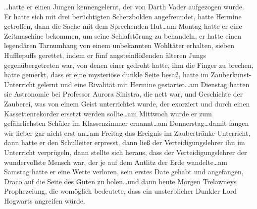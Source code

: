 …hatte er einen Jungen kennengelernt, der von Darth Vader aufgezogen wurde. Er hatte sich mit drei berüchtigten Scherzbolden angefreundet, hatte Hermine getroffen, dann die Sache mit dem Sprechenden Hut…am Montag hatte er eine Zeitmaschine bekommen, um seine Schlafstörung zu behandeln, er hatte einen legendären Tarnumhang von einem unbekannten Wohltäter erhalten, sieben Hufflepuffs gerettet, indem er fünf angsteinflößenden älteren Jungs gegenübergetreten war, von denen einer gedroht hatte, ihm die Finger zu brechen, hatte gemerkt, dass er eine mysteriöse dunkle Seite besaß, hatte im Zauberkunst-Unterricht  gelernt und eine Rivalität mit Hermine gestartet…am Dienstag hatten sie Astronomie bei Professor Aurora Sinistra, die nett war, und Geschichte der Zauberei, was von einem Geist unterrichtet wurde, der exorziert und durch einen Kassettenrekorder ersetzt werden sollte…am Mittwoch wurde er zum gefährlichsten Schüler im Klassenzimmer ernannt…am Donnerstag…damit fangen wir lieber gar nicht erst an…am Freitag das Ereignis im Zaubertränke-Unterricht, dann hatte er den Schulleiter erpresst, dann ließ der Verteidigungslehrer ihn im Unterricht verprügeln, dann stellte sich heraus, dass der Verteidigungslehrer der wundervollste Mensch war, der je auf dem Antlitz der Erde wandelte…am Samstag hatte er eine Wette verloren, sein erstes Date gehabt und angefangen, Draco auf die Seite des Guten zu holen…und dann heute Morgen Trelawneys Prophezeiung, die womöglich bedeutete, dass ein unsterblicher Dunkler Lord Hogwarts angreifen würde.

